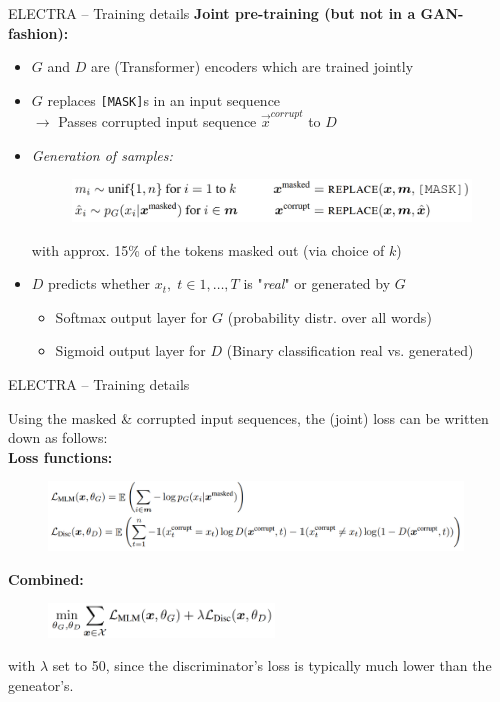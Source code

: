 \begin{frame}{ELECTRA -- Training details}
	\textbf{Joint pre-training (but \textbf{not} in a GAN-fashion):}

	\begin{itemize}
		\item $G$ and $D$ are (Transformer) encoders which are trained jointly
		\item $G$ replaces \texttt{[MASK]}s in an input sequence\\
					$\rightarrow$ Passes corrupted input sequence $\vec{x}^{corrupt}$ to $D$
		\item \textit{Generation of samples:}
	\begin{figure}
		\centering
		\includegraphics[width = 11cm]{figure/electra-samples.png}
	\end{figure}\vspace{-.25cm}
		{\footnotesize with approx. 15\% of the tokens masked out (via choice of $k$)}
		\item $D$ predicts whether $x_t,\; t \in 1, \hdots, T$ is "\textit{real}" or generated by $G$
			\begin{itemize}
				\item Softmax output layer for $G$ (probability distr. over all words)
				\item Sigmoid output layer for $D$ (Binary classification real vs. generated)
			\end{itemize}
	\end{itemize}
\end{frame}


\begin{frame}{ELECTRA -- Training details}

	Using the masked \& corrupted input sequences, the (joint) loss can be written down as follows:\\
	\vspace{.3cm}
	\textbf{Loss functions:}
	\begin{figure}
		\centering
		\includegraphics[width = 11cm]{figure/electra-loss.png}
	\end{figure}
	
	\textbf{Combined:}
	\begin{figure}
		\centering
		\includegraphics[width = 6cm]{figure/electra-loss-comb.png}
	\end{figure}
	{\footnotesize with $\lambda$ set to 50, since the discriminator's loss is typically much lower than the geneator's.}
\end{frame}

